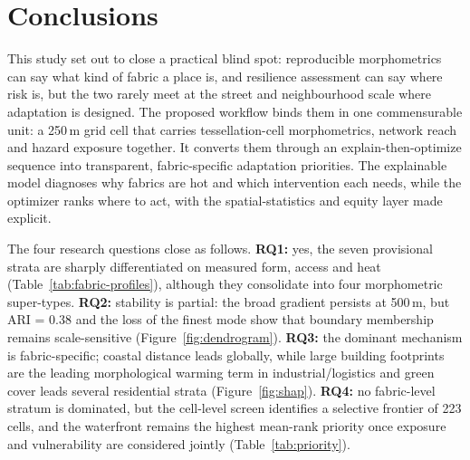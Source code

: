 \section{Conclusions}
\label{sec:conclusions}

This study set out to close a practical blind spot: reproducible morphometrics can
say what kind of fabric a place is, and resilience assessment can say where risk is,
but the two rarely meet at the street and neighbourhood scale where adaptation is
designed. The proposed workflow binds them in one commensurable unit: a
250\,m grid cell that carries tessellation-cell morphometrics, network reach and
hazard exposure together. It converts them through an explain-then-optimize
sequence into transparent, fabric-specific adaptation priorities. The
explainable model diagnoses why fabrics are hot and which
intervention each needs, while the optimizer ranks where to act, with the
spatial-statistics and equity layer made explicit.

The four research questions close as follows. \textbf{RQ1:} yes, the seven
provisional strata are sharply differentiated on measured form, access and heat
(Table~\ref{tab:fabric-profiles}), although they consolidate into four
morphometric super-types. \textbf{RQ2:} stability is partial: the broad gradient
persists at 500\,m, but ARI = 0.38 and the loss of the finest mode show that
boundary membership remains scale-sensitive (Figure~\ref{fig:dendrogram}).
\textbf{RQ3:} the dominant mechanism is fabric-specific; coastal distance leads
globally, while large building footprints are the leading morphological warming
term in industrial/logistics and green cover leads several residential strata
(Figure~\ref{fig:shap}). \textbf{RQ4:} no fabric-level stratum is dominated, but
the cell-level screen identifies a selective frontier of 223 cells, and the
waterfront remains the highest mean-rank priority once exposure and vulnerability
are considered jointly (Table~\ref{tab:priority}).

